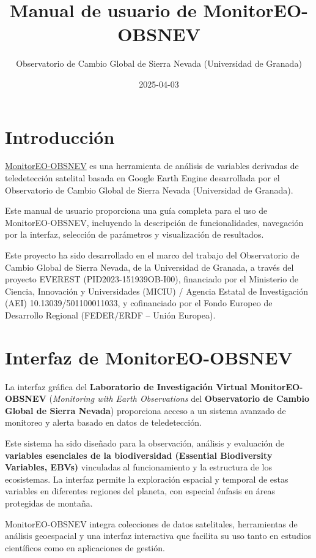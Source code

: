 \documentclass[
]{book}
\title{Manual de usuario de MonitorEO-OBSNEV}
\author{Observatorio de Cambio Global de Sierra Nevada (Universidad de Granada)}
\date{2025-04-03}
\begin{document}
\maketitle

{
\setcounter{tocdepth}{1}
\tableofcontents
}
\chapter{Introducción}\label{intro}

\href{https://sl.ugr.es/monitoreoobsnev}{MonitorEO-OBSNEV} es una herramienta de análisis de variables derivadas de teledetección satelital basada en Google Earth Engine desarrollada por el Observatorio de Cambio Global de Sierra Nevada (Universidad de Granada).

Este manual de usuario proporciona una guía completa para el uso de MonitorEO-OBSNEV, incluyendo la descripción de funcionalidades, navegación por la interfaz, selección de parámetros y visualización de resultados.

Este proyecto ha sido desarrollado en el marco del trabajo del Observatorio de Cambio Global de Sierra Nevada, de la Universidad de Granada, a través del proyecto EVEREST (PID2023-151939OB-I00), financiado por el Ministerio de Ciencia, Innovación y Universidades (MICIU) / Agencia Estatal de Investigación (AEI) 10.13039/501100011033, y cofinanciado por el Fondo Europeo de Desarrollo Regional (FEDER/ERDF -- Unión Europea).

\chapter{Interfaz de MonitorEO-OBSNEV}\label{interfaz}

La interfaz gráfica del \textbf{Laboratorio de Investigación Virtual MonitorEO-OBSNEV} (\emph{Monitoring with Earth Observations} del \textbf{Observatorio de Cambio Global de Sierra Nevada}) proporciona acceso a un sistema avanzado de monitoreo y alerta basado en datos de teledetección.

Este sistema ha sido diseñado para la observación, análisis y evaluación de \textbf{variables esenciales de la biodiversidad (Essential Biodiversity Variables, EBVs)} vinculadas al funcionamiento y la estructura de los ecosistemas. La interfaz permite la exploración espacial y temporal de estas variables en diferentes regiones del planeta, con especial énfasis en áreas protegidas de montaña.

MonitorEO-OBSNEV integra colecciones de datos satelitales, herramientas de análisis geoespacial y una interfaz interactiva que facilita su uso tanto en estudios científicos como en aplicaciones de gestión.
\end{document}
